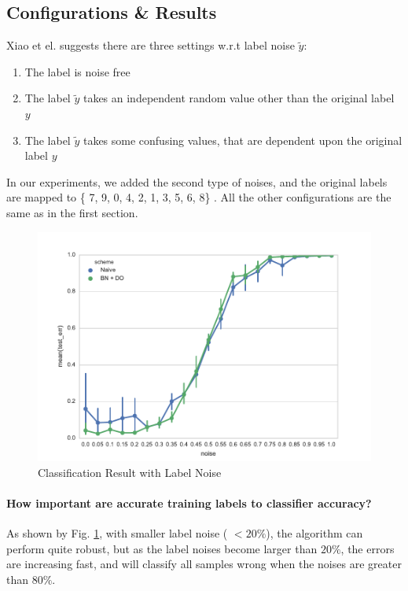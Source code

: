 \documentclass[11pt]{article}
\begin{document}
\subsection{Configurations \& Results}
Xiao et el. \cite{xiao2015learning} suggests there are three settings w.r.t label noise $\tilde{y}$:
\begin{enumerate}
    \item The label is noise free
    \item The label $\tilde{y}$ takes an independent random value other than the original label $y$
    \item The label $\tilde{y}$ takes some confusing values, that are dependent upon the original label $y$
\end{enumerate}

In our experiments, we added the second type of noises, and the original labels are mapped to \{ 7, 9, 0, 4, 2, 1, 3, 5, 6, 8\} . All the other configurations are the same as in the first section.

\begin{figure}
    \includegraphics[width=.9\textwidth]{Figs/exp3}
    \caption{Classification Result with Label Noise}\label{fig:exp3}
\end{figure}

\paragraph{How important are accurate training labels to classifier accuracy?}
As shown by Fig. \ref{fig:exp3}, with smaller label noise ( $< 20\%$), the algorithm can perform quite robust, but as the label noises become larger than $20\%$, the errors are increasing fast, and will classify all samples wrong when the noises are greater than $80\%$.
\end{document}
